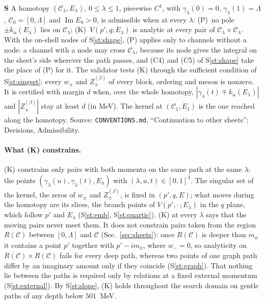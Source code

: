\documentclass[11pt]{article}
\newcommand{\file}[1]{\nolinkurl{#1}}
\newcounter{stmt}
\newenvironment{stmt}[1]{\par\smallskip\refstepcounter{stmt}\noindent\textbf{S\thestmt}\enspace[\textsf{#1}]\enspace\ignorespaces}{\par\smallskip}
\newcommand{\Sr}[1]{S\ref{#1}}
\begin{document}
\begin{stmt}{definition}\label{st:admissible}
A homotopy $(\mathcal C_\lambda,E_\lambda)$, $0\le\lambda\le1$, piecewise $C^1$, with $\gamma_\lambda(0)=0$, $\gamma_\lambda(1)=\Lambda$, $\mathcal C_0=[0,\Lambda]$ and $\operatorname{Im}E_0>0$, is admissible when at every $\lambda$: (P)~no pole $\pm k_\alpha(E_\lambda)$ lies on $\mathcal C_\lambda$; (K)~$V(p',q;E_\lambda)$ is analytic at every pair of $\mathcal C_\lambda\times\mathcal C_\lambda$. With the on-shell nodes of \Sr{st:shape}, (P) applies only to channels without a node: a channel with a node may cross $\mathcal C_\lambda$, because its node gives the integral on the sheet's side wherever the path passes, and (C4) and (C5) of \Sr{st:shape} take the place of (P) for it. The validator tests (K) through the sufficient condition of \Sr{st:singset}: every $w_\pm$ and $Z^{(\beta)}_\pm$ of every block, ordering and meson is nonzero. It is certified with margin $d$ when, over the whole homotopy, $|\gamma_\lambda(t)\mp k_\alpha(E_\lambda)|$ and $|Z^{(\beta)}_\pm|$ stay at least $d$ (in MeV). The kernel at $(\mathcal C_1,E_1)$ is the one reached along the homotopy. Source: \file{CONVENTIONS.md}, ``Continuation to other sheets''; Decisions, Admissibility.
\end{stmt}

\paragraph{What (K) constrains.} (K) constrains only pairs with both momenta on the same path at the same $\lambda$: the points $(\gamma_\lambda(u),\gamma_\lambda(t),E_\lambda)$ with $(\lambda,u,t)\in[0,1]^3$. The singular set of the kernel, the zeros of $w_\pm$ and $Z^{(\beta)}_\pm$, is fixed in $(p',q,E)$; what moves during the homotopy are its slices, the branch points of $V(p',\cdot\,;E_\lambda)$ in the $q$ plane, which follow $p'$ and $E_\lambda$ (\Sr{st:emb}, \Sr{st:quartic}). (K) at every $\lambda$ says that the moving pairs never meet them. It does not constrain pairs taken from the region $R(\mathcal C)$ between $[0,\Lambda]$ and $\mathcal C$ (Sec.~\ref{sec:sheets}): once $R(\mathcal C)$ is deeper than $m_\phi$ it contains a point $p'$ together with $p'-im_\phi$, where $w_-=0$, so analyticity on $R(\mathcal C)\times R(\mathcal C)$ fails for every deep path, whereas two points of one graph path differ by an imaginary amount only if they coincide (\Sr{st:graph}). That nothing lie between the paths is required only by relations at a fixed external momentum (\Sr{st:external}). By \Sr{st:slope}, (K) holds throughout the search domain on gentle paths of any depth below $501$~MeV.
\end{document}
